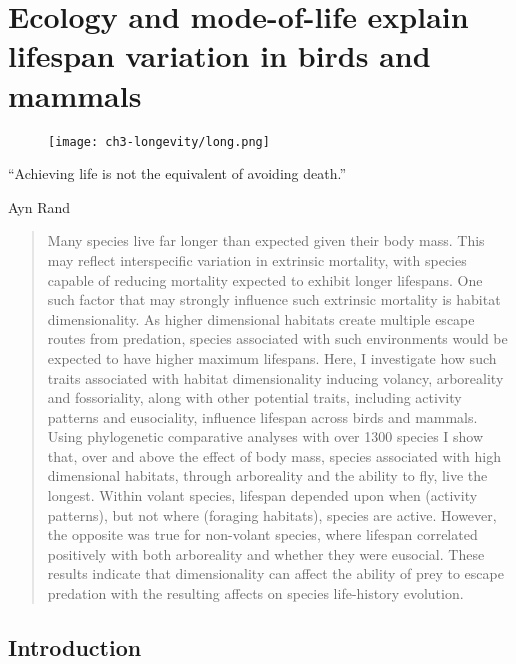 \chapter[Longevity]{Ecology and mode-of-life explain lifespan variation in birds and mammals}
\label{chap:Longevity}


\begin{figure}[h]
  \centering
  \texttt{[image: ch3-longevity/long.png]}
\end{figure}


\begin{quoteshrink}
  ``Achieving life is not the equivalent of avoiding death.''
  
\hfill{Ayn Rand}
\end{quoteshrink}




\begin{abstract}
Many species live far longer than expected given their body mass. This may reflect interspecific variation in extrinsic mortality, with species capable of reducing mortality expected to exhibit longer lifespans. One such factor that may strongly influence such extrinsic mortality is habitat dimensionality. As higher dimensional habitats create multiple escape routes from predation, species associated with such environments would be expected to have higher maximum lifespans. Here, I investigate how such traits associated with habitat dimensionality inducing volancy, arboreality and fossoriality, along with other potential traits, including activity patterns and eusociality, influence lifespan across birds and mammals. Using phylogenetic comparative analyses with over 1300 species I show that, over and above the effect of body mass, species associated with high dimensional habitats, through arboreality and the ability to fly, live the longest. Within volant species, lifespan depended upon when (activity patterns), but not where (foraging habitats), species are active. However, the opposite was true for non-volant species, where lifespan correlated positively with both arboreality and whether they were eusocial. These results indicate that dimensionality can affect the ability of prey to escape predation with the resulting affects on species life-history evolution. 

\end{abstract}

\section{Introduction}

